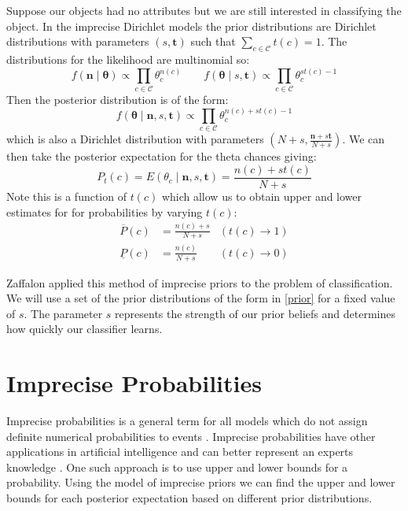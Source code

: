 Suppose our objects had no attributes but we are still interested in classifying the object.
In the imprecise Dirichlet models the prior distributions are Dirichlet distributions with parameters $(s, \mathbf{t})$ such that $\sum_{c \in \mathcal{C}} t(c) = 1$.
The distributions for the likelihood are multinomial so:
\begin{equation}
	f(\mathbf{n} \mid \mathbf{\theta}) \propto \prod_{c \in \mathcal{C}} \theta_c^{n(c)}
	\qquad
	f(\mathbf{\theta} \mid s, \mathbf{t}) \propto \prod_{c \in \mathcal{C}} \theta_c^{st(c) - 1}
\end{equation}
Then the posterior distribution is of the form:
\begin{equation} \label{dirichlet_pdf2}
	f(\mathbf{\theta} \mid \mathbf{n}, s, \mathbf{t}) \propto \prod_{c \in \mathcal{C}} \theta_c^{n(c) + st(c) - 1}
\end{equation}
which is also a Dirichlet distribution with parameters $(N+s, \frac{\mathbf{n}+s\mathbf{t}}{N+s})$.
We can then take the posterior expectation for the theta chances giving:
\begin{equation}
	P_t(c) = E(\theta_c \mid \mathbf{n}, s, \mathbf{t}) = \frac{n(c)+st(c)}{N+s}
\end{equation}
Note this is a function of $t(c)$ which allow us to obtain upper and lower estimates for for probabilities by varying $t(c)$:
\begin{align}
	\overline{P}(c) & = \frac{n(c)+s}{N+s} & (t(c) \rightarrow 1) \\
	\underline{P}(c) & = \frac{n(c)}{N+s}  & (t(c) \rightarrow 0)
\end{align}

Zaffalon applied this method of imprecise priors to the problem of classification.
We will use a set of the prior distributions of the form in \cref{prior} for a fixed value of $s$.
The parameter $s$ represents the strength of our prior beliefs and determines how quickly our classifier learns.

\section{Imprecise Probabilities}

Imprecise probabilities is a general term for all models which do not assign definite numerical probabilities to events \cite{Walley91}.
Imprecise probabilities have other applications in artificial intelligence and can better represent an experts knowledge \cite{}.
One such approach is to use upper and lower bounds for a probability.
Using the model of imprecise priors we can find the upper and lower bounds for each posterior expectation based on different prior distributions.

